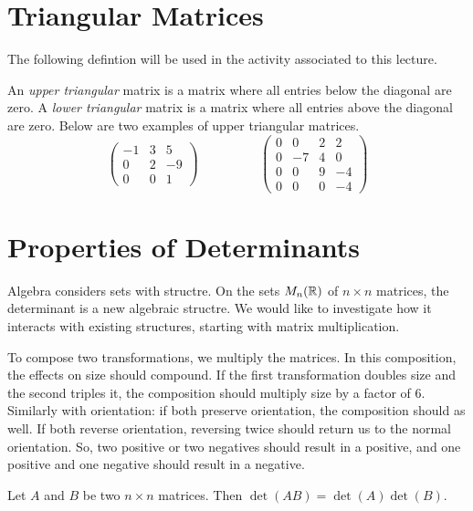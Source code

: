 \documentclass[fleqn]{report}
\begin{document}
\section{Triangular Matrices}

The following defintion will be used in the activity
associated to this lecture.

\begin{defn}
An \emph{upper triangular} matrix is a matrix where all entries
below the diagonal are zero. A \emph{lower triangular} matrix
is a matrix where all entries above the diagonal are zero.
Below are two examples of upper triangular matrices.
\begin{displaymath}
\left(
\begin{matrix}
-1 & 3 & 5 \\
0 & 2 & -9 \\
0 & 0 & 1 
\end{matrix}
\right)
\hspace{2cm}
\left(
\begin{matrix}
0 & 0 & 2 & 2 \\
0 & -7 & 4 & 0 \\
0 & 0 & 9 & -4 \\
0 & 0 & 0 & -4 
\end{matrix}
\right)
\end{displaymath}
\end{defn}

\section{Properties of Determinants}

Algebra considers sets with structre. On the sets $M_n(\mathbb{R})$
of $n \times n$ matrices, the determinant is a new algebraic
structre. We would like to investigate how it interacts with
existing structures, starting with matrix multiplication.

To compose two transformations, we multiply the matrices.
In this composition, the effects on size should compound. If the
first transformation doubles size and the second triples it,
the composition should multiply size by a factor of $6$.
Similarly with orientation: if both preserve orientation, the
composition should as well. If both reverse orientation,
reversing twice should return us to the normal orientation.
So, two positive or two negatives should result in a positive,
and one positive and one negative should result in a negative.

\begin{prop}
Let $A$ and $B$ be two $n \times n$ matrices. Then $\det (AB)
= \det (A) \det (B)$.
\end{prop}
\end{document}
